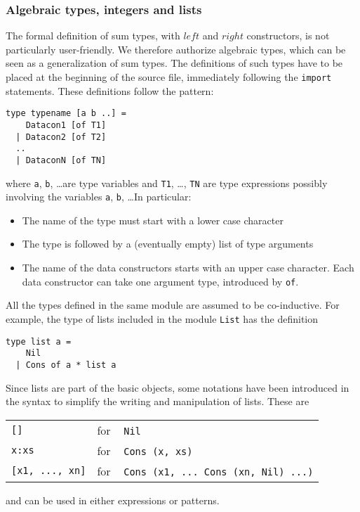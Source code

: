 \subsubsection{Algebraic types, integers and lists}

The formal definition of sum types, with $left$ and $right$ constructors, 
is not particularly user-friendly. We therefore authorize algebraic types, 
which can be seen as a generalization of sum types. The definitions of such 
types have to be placed at the beginning of the source file, immediately 
following the \verb#import# statements. These definitions follow the pattern: 
\begin{verbatim}
type typename [a b ..] =
    Datacon1 [of T1]
  | Datacon2 [of T2]
  ..
  | DataconN [of TN]
\end{verbatim}
where \verb#a#, \verb#b#, \ldots are type variables and \verb#T1#, \ldots, 
\verb#TN# are type expressions possibly involving the variables \verb#a#, 
\verb#b#, \ldots In particular:
\begin{itemize}
  \item The name of the type must start with a lower case character
  \item The type is followed by a (eventually empty) list of type arguments
  \item The name of the data constructors starts with an upper case  
  character. Each data constructor can take one argument type, introduced 
  by \verb#of#.
\end{itemize}

All the types defined in the same module are assumed to be co-inductive. For 
example, the type of lists included in the module \verb#List# has the 
definition
\begin{verbatim}
type list a =
    Nil
  | Cons of a * list a
\end{verbatim}
Since lists are part of the basic objects, some notations have been introduced in the syntax to simplify the writing and manipulation of lists. 
These are
\begin{center}
\begin{tabular}{ll}
  \verb#[]#               & for ~ \verb#Nil# \\
  \verb#x:xs#             & for ~ \verb#Cons (x, xs)# \\
  \verb#[x1, ..., xn]# & for ~ 
                            \verb#Cons (x1, ... Cons (xn, Nil) ...)#
\end{tabular}
\end{center}
and can be used in either expressions or patterns.

